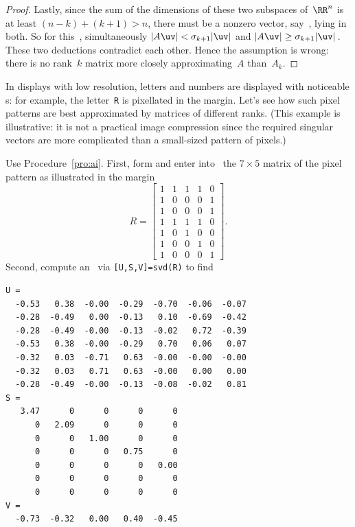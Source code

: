 \begin{proof}
Lastly, since the sum of the dimensions of these two subspaces of~\(\RR^n\) is at least \((n-k)+(k+1)>n\), there must be a nonzero vector, say~\uv, lying in both.
So for this~\uv, simultaneously \(|A\uv|<\sigma_{k+1}|\uv|\) and \(|A\uv|\geq\sigma_{k+1}|\uv|\)\,.
These two deductions contradict each other.
Hence the assumption is wrong: there is no rank~\(k\) matrix more closely approximating~\(A\) than~\(A_k\).
\end{proof}



\begin{example} \label{eg:}
In displays with low resolution, letters and numbers are displayed with noticeable s: for example, the letter~\verb|R| is pixellated in the margin.
\marginpar{}
Let's see how such pixel patterns are best approximated by matrices of different ranks.
(This example is illustrative: it is not a practical image compression since the required singular vectors are more complicated than a small-sized pattern of pixels.)
\begin{solution} 
Use Procedure~\ref{pro:ai}.
First, form and enter into \script\ the \(7\times5\) matrix of the pixel pattern as illustrated in the margin
\begin{equation*}
R=\begin{bmatrix} 1&1&1&1&0
\\1&0&0&0&1
\\1&0&0&0&1
\\1&1&1&1&0
\\1&0&1&0&0
\\1&0&0&1&0
\\1&0&0&0&1 \end{bmatrix}.
\end{equation*}
Second, compute an \svd\ via \verb|[U,S,V]=svd(R)| to find \twodp
\begin{verbatim}
U =
  -0.53   0.38  -0.00  -0.29  -0.70  -0.06  -0.07
  -0.28  -0.49   0.00  -0.13   0.10  -0.69  -0.42
  -0.28  -0.49  -0.00  -0.13  -0.02   0.72  -0.39
  -0.53   0.38  -0.00  -0.29   0.70   0.06   0.07
  -0.32   0.03  -0.71   0.63  -0.00  -0.00  -0.00
  -0.32   0.03   0.71   0.63  -0.00   0.00   0.00
  -0.28  -0.49  -0.00  -0.13  -0.08  -0.02   0.81
S =
   3.47      0      0      0      0
      0   2.09      0      0      0
      0      0   1.00      0      0
      0      0      0   0.75      0
      0      0      0      0   0.00
      0      0      0      0      0
      0      0      0      0      0
V =
  -0.73  -0.32   0.00   0.40  -0.45

\end{verbatim}
\end{solution}
\end{example}
